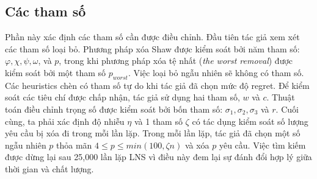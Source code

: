 \subsection{Các tham số}
Phần này xác định các tham số cần được điều chỉnh. Đầu tiên tác giả xem xét các tham số loại bỏ. Phương pháp xóa Shaw được kiểm soát bởi năm tham số: $\varphi, \chi, \psi, \omega$, và $p$, trong khi phương pháp xóa tệ nhất (\textit{the worst removal}) được kiểm soát bởi một tham số $p_{worst}$. Việc loại bỏ ngẫu nhiên sẽ không có tham số. Các heuristics chèn có tham số tự do khi tác giả đã chọn mức độ regret.
Để kiểm soát các tiêu chí được chấp nhận, tác giả sử dụng hai tham số, $w$ và $c$. Thuật toán điều chỉnh trọng số được kiểm soát bởi bốn tham số: $\sigma_1, \sigma_2, \sigma_3$ và $r$. Cuối cùng, ta phải xác định độ nhiễu $\eta$ và 1 tham số $\zeta$ có tác dụng kiểm soát số lượng yêu cầu bị xóa đi trong mỗi lần lặp. Trong mỗi lần lặp, tác giả đã chọn một số ngẫu nhiên $p$ thỏa mãn $4 \leq p \leq min(100, \zeta n)$ và xóa $p$ yêu cầu. Việc tìm kiếm được dừng lại sau 25,000 lần lặp LNS vì điều này đem lại sự đánh đổi hợp lý giữa thời gian và chất lượng.

